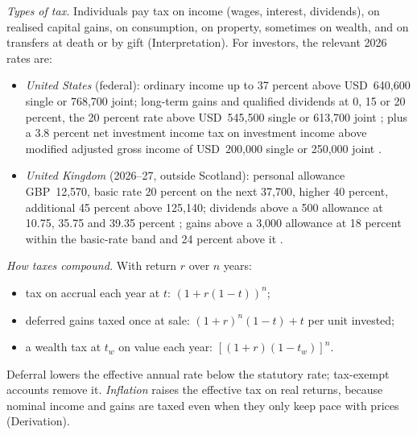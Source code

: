 \begin{qfmethod}\label{meth:private-client-tax-inflation}
 \emph{Types of tax.} Individuals pay tax on income (wages, interest, dividends), on realised capital gains, on consumption, on property, sometimes on wealth, and on transfers at death or by gift (Interpretation). For investors, the relevant 2026 rates are:
\begin{itemize}
\item \emph{United States} (federal): ordinary income up to 37 percent above USD~640,600 single or 768,700 joint; long-term gains and qualified dividends at 0, 15 or 20 percent, the 20 percent rate above USD~545,500 single or 613,700 joint \citep[secs.~4.01, 4.03]{irs-rev-proc-2025-32}; plus a 3.8 percent net investment income tax on investment income above modified adjusted gross income of USD~200,000 single or 250,000 joint \citep[sec.~1411]{us-internal-revenue-code-26}.
\item \emph{United Kingdom} (2026--27, outside Scotland): personal allowance GBP~12,570, basic rate 20 percent on the next 37,700, higher 40 percent, additional 45 percent above 125,140; dividends above a 500 allowance at 10.75, 35.75 and 39.35 percent \citep[tables]{govuk-income-tax-rates-2026}; gains above a 3,000 allowance at 18 percent within the basic-rate band and 24 percent above it \citep[rates page]{govuk-cgt-rates-2026}.
\end{itemize}

\emph{How taxes compound.} With return $r$ over $n$ years:
\begin{itemize}
\item tax on accrual each year at $t$: $(1+r(1-t))^n$;
\item deferred gains taxed once at sale: $(1+r)^n(1-t)+t$ per unit invested;
\item a wealth tax at $t_w$ on value each year: $[(1+r)(1-t_w)]^n$.
\end{itemize}
Deferral lowers the effective annual rate below the statutory rate; tax-exempt accounts remove it. \emph{Inflation} raises the effective tax on real returns, because nominal income and gains are taxed even when they only keep pace with prices (Derivation).


\end{qfmethod}
